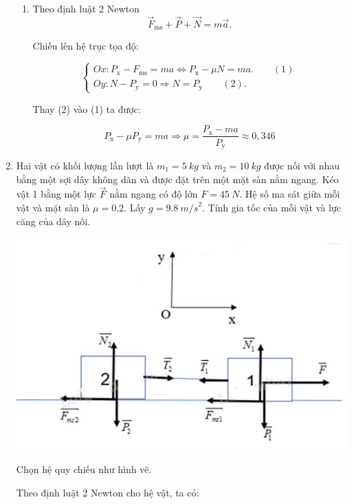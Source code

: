 \begin{enumerate}[label=\bfseries Bài \arabic*:]
{\begin{enumerate}[label=\alph*)]
		
		\item Theo định luật 2 Newton
		$$\vec F_\text{ms} + \vec P + \vec N = m\vec a.$$
		
		Chiếu lên hệ trục tọa độ:
		
		$$\begin{cases}
			Ox: P_\text{x} - F_\text{ms} =ma \Leftrightarrow  P_\text{x} - \mu N = ma.\qquad (1) \\
			Oy: N - P_\text{y}= 0 \Rightarrow N =P_\text{y}\qquad (2).
			
		\end{cases}$$
		
		Thay (2) vào (1) ta được:
		
		$$ P_\text{x} - \mu P_\text{y} = ma \Rightarrow \mu = \dfrac{ P_\text{x}  -ma}{ P_\text{y}} \approx 0,346 $$
	\end{enumerate}
}

\item {}


{
	Hai vật có khối lượng lần lượt là $m_1 = \SI{5}{kg}$ và $m_2 = \SI{10}{kg}$ được nối với nhau bằng một sợi dây không dãn và được đặt trên một mặt sàn nằm ngang. Kéo vật 1 bằng một lực $\vec F$ nằm ngang có độ lớn $F = \SI{45}{N}$. Hệ số ma sát giữa mỗi vật và mặt sàn là $\mu = \text{0,2}$. Lấy $g = \SI{9,8}{m/s}^2$. Tính gia tốc của mỗi vật và lực căng của dây nối.
}

\hideall
{
	\begin{center}
		\includegraphics[scale=0.8]{../figs/VN10-2022-PH-TP021-13.jpg}
	\end{center}
	
	
	Chọn hệ quy chiếu như hình vẽ.
	
	Theo định luật 2 Newton cho hệ vật, ta có:
	
}
\end{enumerate}
